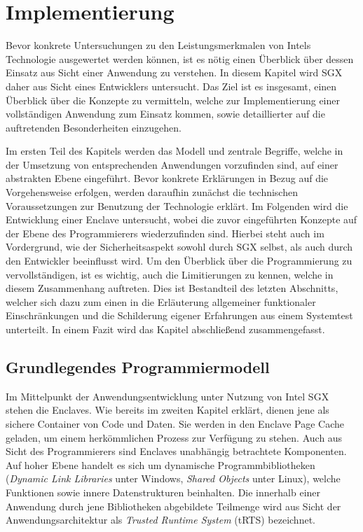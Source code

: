 
\chapter{Implementierung}

Bevor konkrete Untersuchungen zu den Leistungsmerkmalen von Intels Technologie ausgewertet werden können, ist es nötig einen Überblick über dessen Einsatz aus Sicht einer Anwendung zu verstehen. In diesem Kapitel wird SGX daher aus Sicht eines Entwicklers untersucht. Das Ziel ist es insgesamt, einen Überblick über die Konzepte zu vermitteln, welche zur Implementierung einer vollständigen Anwendung zum Einsatz kommen, sowie detaillierter auf die auftretenden Besonderheiten einzugehen.

Im ersten Teil des Kapitels werden das Modell und zentrale Begriffe, welche in der Umsetzung von entsprechenden Anwendungen vorzufinden sind, auf einer abstrakten Ebene eingeführt. Bevor konkrete Erklärungen in Bezug auf die Vorgehensweise erfolgen, werden daraufhin zunächst die technischen Voraussetzungen zur Benutzung der Technologie erklärt. Im Folgenden wird die Entwicklung einer Enclave untersucht, wobei die zuvor eingeführten Konzepte auf der Ebene des Programmierers wiederzufinden sind. Hierbei steht auch im Vordergrund, wie der Sicherheitsaspekt sowohl durch SGX selbst, als auch durch den Entwickler beeinflusst wird. Um den Überblick über die Programmierung zu vervollständigen, ist es wichtig, auch die Limitierungen zu kennen, welche in diesem Zusammenhang auftreten. Dies ist Bestandteil des letzten Abschnitts, welcher sich dazu zum einen in die Erläuterung allgemeiner funktionaler Einschränkungen und die Schilderung eigener Erfahrungen aus einem Systemtest unterteilt. In einem Fazit wird das Kapitel abschließend zusammengefasst.

\section{Grundlegendes Programmiermodell}

Im Mittelpunkt der Anwendungsentwicklung unter Nutzung von Intel SGX stehen die Enclaves. Wie bereits im zweiten Kapitel erklärt, dienen jene als sichere Container von Code und Daten. Sie werden in den Enclave Page Cache geladen, um einem herkömmlichen Prozess zur Verfügung zu stehen. Auch aus Sicht des Programmierers sind Enclaves unabhängig betrachtete Komponenten. Auf hoher Ebene handelt es sich um dynamische Programmbibliotheken (\textit{Dynamic Link Libraries} unter Windows,  \textit{Shared Objects} unter Linux), welche Funktionen sowie innere Datenstrukturen beinhalten. Die innerhalb einer Anwendung durch jene Bibliotheken abgebildete Teilmenge wird aus Sicht der Anwendungsarchitektur als \textit{Trusted Runtime System} (tRTS) bezeichnet.

